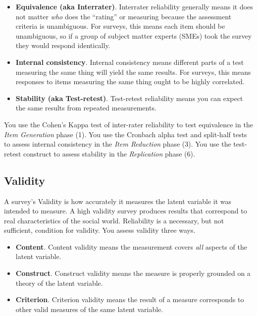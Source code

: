 \documentclass[
]{book}
\providecommand{\tightlist}{%
  \setlength{\itemsep}{0pt}\setlength{\parskip}{0pt}}
\theoremstyle{definition}
\theoremstyle{definition}
\theoremstyle{definition}
\theoremstyle{definition}
\theoremstyle{remark}
\begin{document}
\begin{itemize}
\tightlist
\item
  \textbf{Equivalence (aka Interrater)}. Interrater reliability generally means it does not matter \emph{who} does the ``rating'' or measuring because the assessment criteria is unambiguous. For surveys, this means each item should be unambiguous, so if a group of subject matter experts (SMEs) took the survey they would respond identically.
\item
  \textbf{Internal consistency}. Internal consistency means different parts of a test measuring the same thing will yield the same results. For surveys, this means responses to items measuring the same thing ought to be highly correlated.
\item
  \textbf{Stability (aka Test-retest)}. Test-retest reliability means you can expect the same results from repeated measurements.
\end{itemize}

You use the Cohen's Kappa test of inter-rater reliability to test equivalence in the \emph{Item Generation} phase (1). You use the Cronbach alpha test and split-half tests to assess internal consistency in the \emph{Item Reduction} phase (3). You use the test-retest construct to assess stability in the \emph{Replication} phase (6).

\hypertarget{validity}{%
\subsection{Validity}\label{validity}}

A survey's Validity is how accurately it measures the latent variable it was intended to measure. A high validity survey produces results that correspond to real characteristics of the social world. Reliability is a necessary, but not sufficient, condition for validity. You assess validity three ways.

\begin{itemize}
\tightlist
\item
  \textbf{Content}. Content validity means the measurement covers \emph{all} aspects of the latent variable.
\item
  \textbf{Construct}. Construct validity means the measure is properly grounded on a theory of the latent variable.
\item
  \textbf{Criterion}. Criterion validity means the result of a measure corresponds to other valid measures of the same latent variable.
\end{itemize}
\end{document}
